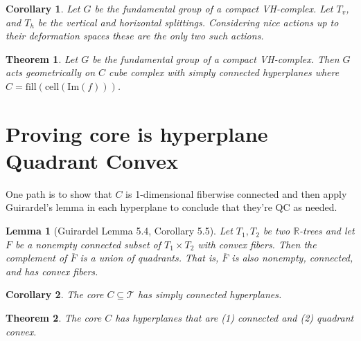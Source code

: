 \documentclass{article}
\theoremstyle{mystyle}
\newtheorem{thm}{Theorem}[section]
\newtheorem{lem}{Lemma}[section]
\newtheorem*{cor*}{Corollary}
\theoremstyle{remark}
\begin{document}
\begin{cor*}
    Let \(G\) be the fundamental group of a compact VH-complex. Let \(T_{v}\), and \(T_{h}\) be the vertical and horizontal splittings. Considering {\em nice} actions up to their deformation spaces these are the only two such actions.
\end{cor*}
\begin{thm}
    Let \(G\) be the fundamental group of a compact VH-complex. Then \(G\) acts geometrically on \(C\) cube complex with simply connected hyperplanes where \(C = \text{fill}( \text{cell}( \text{Im}(f) ) )\).
\end{thm}
\section{Proving core is hyperplane Quadrant Convex}
One path is to show that \(C\) is 1-dimensional fiberwise connected and then apply Guirardel's lemma in each hyperplane to conclude that they're QC as needed.

\begin{lem}
	[Guirardel Lemma 5.4, Corollary 5.5]
 \label{lem:guirardel} 
	Let \(T_{1} , T_{2}\) be two \(\mathbb{R}\)-trees and let \(F\) be a nonempty connected subset of \(T_{1} \times T_{2}\) with convex fibers. Then the complement of \(\overline{F}\) is a union of quadrants. That is, \(\overline{F}\) is also nonempty, connected, and has convex fibers.
\end{lem}

\begin{cor*}
    The core \(C \subseteq \mathscr{T}\) has simply connected hyperplanes.
\end{cor*}
\begin{thm}
    The core \(C\) has hyperplanes that are (1) connected and (2) quadrant convex.
\end{thm}
\end{document}

